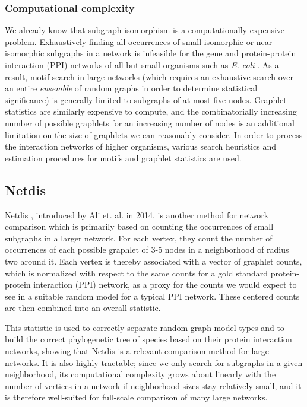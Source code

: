 \documentclass[12pt]{thesis}
\theoremstyle{plain}
\theoremstyle{definition}
\theoremstyle{remark}
\begin{document}
\subsubsection{Computational complexity}

We already know that subgraph isomorphism is a computationally expensive problem. Exhaustively finding all occurrences of small isomorphic or near-isomorphic subgraphs in a network is infeasible for the gene and protein-protein interaction (PPI) networks of all but small organisms such as \textit{E. coli} \cite{Emmert_Streib_2016}. As a result, motif search in large networks (which requires an exhaustive search over an entire \textit{ensemble} of random graphs in order to determine statistical significance) is generally limited to subgraphs of at most five nodes. Graphlet statistics are similarly expensive to compute, and the combinatorially increasing number of possible graphlets for an increasing number of nodes is an additional limitation on the size of graphlets we can reasonably consider. In order to process the interaction networks of higher organisms, various search heuristics and estimation procedures for motifs and graphlet statistics are used.

\subsection{Netdis}

Netdis \cite{Ali_2014}, introduced by Ali et. al. in 2014, is another method for network comparison which is primarily based on counting the occurrences of small subgraphs in a larger network. For each vertex, they count the number of occurrences of each possible graphlet of 3-5 nodes in a neighborhood of radius two around it. Each vertex is thereby associated with a vector of graphlet counts, which is normalized with respect to the same counts for a gold standard protein-protein interaction (PPI) network, as a proxy for the counts we would expect to see in a suitable random model for a typical PPI network. These centered counts are then combined into an overall statistic. 

This statistic is used to correctly separate random graph model types and to build the correct phylogenetic tree of species based on their protein interaction networks, showing that Netdis is a relevant comparison method for large networks. It is also highly tractable; since we only search for subgraphs in a given neighborhood, its computational complexity grows about linearly with the number of vertices in a network if neighborhood sizes stay relatively small, and it is therefore well-suited for full-scale comparison of many large networks.
\end{document}
